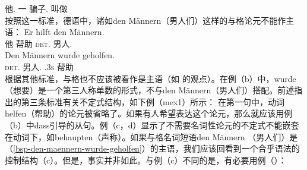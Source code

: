      他.\nom{} \passivepst{} 一 骗子.\nom{} 叫做\\
\zl
按照这一标准，德语中，诸如den Männern（男人们）这样的与格论元不能作主语：
\eal
\ex 
\gll Er hilft den Männern.\\
	 他 帮助 \textsc{det}.\dat{} 男人.\dat{}\\
\ex
\label{bsp-den-maennern-wurde-geholfen}
\gll Den Männern wurde geholfen.\\
     \textsc{det}.\dat{} 男人.\dat{} \passivepst.3\textsc{s} 帮助\\
\zl
根据其他标准，与格也不应该被看作是主语（如 \citet{Reis82}的观点）。在例（b）中，wurde（想要）是一个第三人称单数的形式，不与den Männern（男人们）搭配。前述指出的第三条标准有关不定式结构，如下例（mex{1}）所示：
\eal
{}
\zl
%
在第一句中，动词helfen（帮助）的论元被省略了。如果有人希望表达这个论元，那么就应该用例（b）中dass引导的从句。例（c，d）显示了不需要名词性论元的不定式不能嵌套在动词下，如behaupten（声称）。如果与格名词短语den Männern
（男人们）是（\ref{bsp-den-maennern-wurde-geholfen}）的主语，我们应该回看到一个合乎语法的控制结构（c）。但是，事实并非如此。与例（c）不同的是，有必要用例（）：
